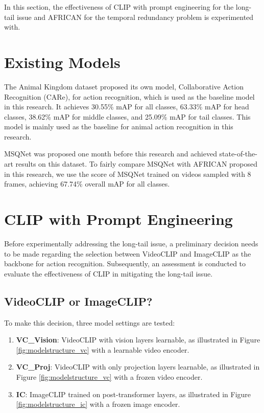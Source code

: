 In this section, the effectiveness of CLIP with prompt engineering for the long-tail issue and AFRICAN for the temporal redundancy problem is experimented with.

\section {Existing Models}
The Animal Kingdom dataset proposed its own model, Collaborative Action Recognition (CARe), for action recognition, which is used as the baseline model in this research. It achieves 30.55\% mAP for all classes, 63.33\% mAP for head classes, 38.62\% mAP for middle classes, and 25.09\% mAP for tail classes. This model is mainly used as the baseline for animal action recognition in this research.

MSQNet was proposed one month before this research and achieved state-of-the-art results on this dataset. To fairly compare MSQNet \parencite{mondal2023msqnet} with AFRICAN proposed in this research, we use the score of MSQNet trained on videos sampled with 8 frames, achieving 67.74\% overall mAP for all classes. 

\section{CLIP with Prompt Engineering}
Before experimentally addressing the long-tail issue, a preliminary decision needs to be made regarding the selection between VideoCLIP and ImageCLIP as the backbone for action recognition. Subsequently, an assessment is conducted to evaluate the effectiveness of CLIP in mitigating the long-tail issue.

\subsection{VideoCLIP or ImageCLIP?}
\label{sec:imageclipbetter}
To make this decision, three model settings are tested: 

\begin{enumerate}
    \item \textbf{VC\_Vision}: VideoCLIP with vision layers learnable, as illustrated in Figure \ref{fig:modelstructure_vc} with a learnable video encoder.
    \item \textbf{VC\_Proj}: VideoCLIP with only projection layers learnable, as illustrated in Figure \ref{fig:modelstructure_vc} with a frozen video encoder.
    \item \textbf{IC}: ImageCLIP trained on post-transformer layers, as illustrated in Figure \ref{fig:modelstructure_ic} with a frozen image encoder.
\end{enumerate}

